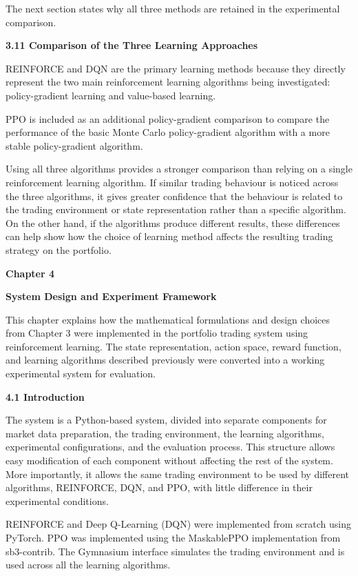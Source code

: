 The next section states why all three methods are retained in the
experimental comparison.

\textbf{3.11 Comparison of the Three Learning Approaches}

REINFORCE and DQN are the primary learning methods because they directly
represent the two main reinforcement learning algorithms being
investigated: policy-gradient learning and value-based learning.

PPO is included as an additional policy-gradient comparison to compare
the performance of the basic Monte Carlo policy-gradient algorithm with
a more stable policy-gradient algorithm.

Using all three algorithms provides a stronger comparison than relying
on a single reinforcement learning algorithm. If similar trading
behaviour is noticed across the three algorithms, it gives greater
confidence that the behaviour is related to the trading environment or
state representation rather than a specific algorithm. On the other
hand, if the algorithms produce different results, these differences can
help show how the choice of learning method affects the resulting
trading strategy on the portfolio.

\textbf{Chapter 4}

\textbf{System Design and Experiment Framework}

This chapter explains how the mathematical formulations and design
choices from Chapter 3 were implemented in the portfolio trading system
using reinforcement learning. The state representation, action space,
reward function, and learning algorithms described previously were
converted into a working experimental system for evaluation.

\textbf{4.1 Introduction}

The system is a Python-based system, divided into separate components
for market data preparation, the trading environment, the learning
algorithms, experimental configurations, and the evaluation process.
This structure allows easy modification of each component without
affecting the rest of the system. More importantly, it allows the same
trading environment to be used by different algorithms, REINFORCE, DQN,
and PPO, with little difference in their experimental conditions.

REINFORCE and Deep Q-Learning (DQN) were implemented from scratch using
PyTorch. PPO was implemented using the MaskablePPO implementation from
sb3-contrib. The Gymnasium interface simulates the trading environment
and is used across all the learning algorithms.

